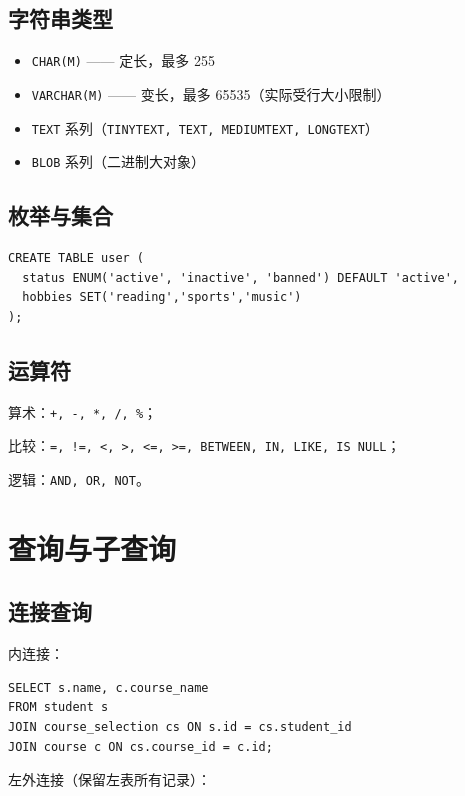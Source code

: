 \documentclass[12pt,UTF8]{ctexbook}
\begin{document}
\section{字符串类型}

\begin{itemize}
  \item \texttt{CHAR(M)} —— 定长，最多 255
  \item \texttt{VARCHAR(M)} —— 变长，最多 65535（实际受行大小限制）
  \item \texttt{TEXT} 系列（\texttt{TINYTEXT, TEXT, MEDIUMTEXT, LONGTEXT}）
  \item \texttt{BLOB} 系列（二进制大对象）
\end{itemize}

\section{枚举与集合}

\begin{lstlisting}
CREATE TABLE user (
  status ENUM('active', 'inactive', 'banned') DEFAULT 'active',
  hobbies SET('reading','sports','music')
);
\end{lstlisting}

\section{运算符}

算术：\texttt{+, -, *, /, \%}；

比较：\texttt{=, !=, <, >, <=, >=, BETWEEN, IN, LIKE, IS NULL}；

逻辑：\texttt{AND, OR, NOT}。

\chapter{查询与子查询}
\label{ch:subquery}

\section{连接查询}

内连接：

\begin{lstlisting}
SELECT s.name, c.course_name
FROM student s
JOIN course_selection cs ON s.id = cs.student_id
JOIN course c ON cs.course_id = c.id;
\end{lstlisting}

左外连接（保留左表所有记录）：
\end{document}

